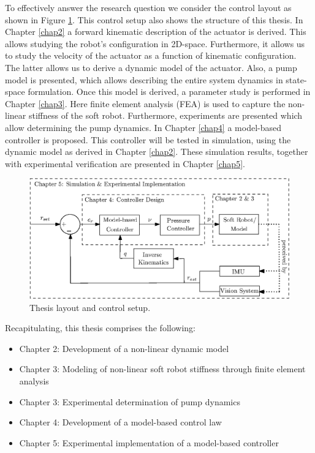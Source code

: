 To effectively answer the research question we consider the control layout as shown in Figure \ref{fig1:controlarchitecture}. This control setup also shows the structure of this thesis. In Chapter \ref{chap2} a forward kinematic description of the actuator is derived. This allows studying the robot's configuration in 2D-space. Furthermore, it allows us to study the velocity of the actuator as a function of kinematic configuration. The latter allows us to derive a dynamic model of the actuator. Also, a pump model is presented, which allows describing the entire system dynamics in state-space formulation. Once this model is derived, a parameter study is performed in Chapter \ref{chap3}. Here finite element analysis (FEA) is used to capture the non-linear stiffness of the soft robot. Furthermore, experiments are presented which allow determining the pump dynamics. In Chapter \ref{chap4} a model-based controller is proposed. This controller will be tested in simulation, using the dynamic model as derived in Chapter \ref{chap2}. These simulation results, together with experimental verification are presented in Chapter \ref{chap5}.




\begin{figure}[H]
    \centering
    \includegraphics[width = \textwidth]{Figures/Chapter1/controlschemeCompleteGood.eps}
    \caption{Thesis layout and control setup.}
    \label{fig1:controlarchitecture}
\end{figure}


Recapitulating, this thesis comprises the following:


\begin{itemize}
    \item Chapter 2: Development of a non-linear dynamic model
    \item Chapter 3: Modeling of non-linear soft robot stiffness through finite element analysis
    \item Chapter 3: Experimental determination of pump dynamics
    \item Chapter 4: Development of a model-based control law
    \item Chapter 5: Experimental implementation of a model-based controller
\end{itemize}


